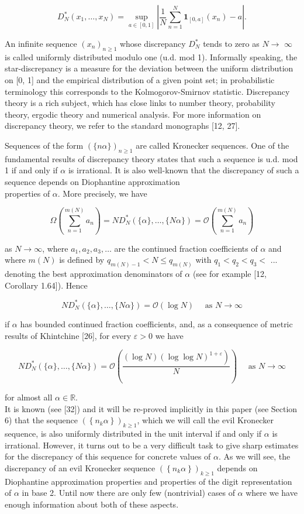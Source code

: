 \documentclass[10pt]{article}
\begin{document}
$$
D_{N}^{*}\left(x_{1}, \ldots, x_{N}\right)=\sup _{a \in[0,1]}\left|\frac{1}{N} \sum_{n=1}^{N} \mathbf{1}_{[0, a]}\left(x_{n}\right)-a\right| .
$$

An infinite sequence $\left(x_{n}\right)_{n \geqslant 1}$ whose discrepancy $D_{N}^{*}$ tends to zero as $N \rightarrow$ $\infty$ is called uniformly distributed modulo one (u.d. mod 1). Informally speaking, the star-discrepancy is a measure for the deviation between the uniform distribution on [0, 1] and the empirical distribution of a given point set; in probabilistic terminology this corresponds to the Kolmogorov-Smirnov statistic. Discrepancy theory is a rich subject, which has close links to number theory, probability theory, ergodic theory and numerical analysis. For more information on discrepancy theory, we refer to the standard monographs [12, 27].

Sequences of the form $(\{n \alpha\})_{n \geqslant 1}$ are called Kronecker sequences. One of the fundamental results of discrepancy theory states that such a sequence is u.d. mod 1 if and only if $\alpha$ is irrational. It is also well-known that the discrepancy of such a sequence depends on Diophantine approximation\\
properties of $\alpha$. More precisely, we have

$$
\Omega\left(\sum_{n=1}^{m(N)} a_{n}\right)=N D_{N}^{*}(\{\alpha\}, \ldots,\{N \alpha\})=\mathcal{O}\left(\sum_{n=1}^{m(N)} a_{n}\right)
$$

as $N \rightarrow \infty$, where $a_{1}, a_{2}, a_{3}, \ldots$ are the continued fraction coefficients of $\alpha$ and where $m(N)$ is defined by $q_{m(N)-1}<N \leqslant q_{m(N)}$ with $q_{1}<q_{2}<q_{3}<$ ... denoting the best approximation denominators of $\alpha$ (see for example [12, Corollary 1.64]). Hence

$$
N D_{N}^{*}(\{\alpha\}, \ldots,\{N \alpha\})=\mathcal{O}(\log N) \quad \text { as } N \rightarrow \infty
$$

if $\alpha$ has bounded continued fraction coefficients, and, as a consequence of metric results of Khintchine [26], for every $\varepsilon>0$ we have

$$
N D_{N}^{*}(\{\alpha\}, \ldots,\{N \alpha\})=\mathcal{O}\left(\frac{\left.(\log N)(\log \log N)^{1+\varepsilon}\right)}{N}\right) \quad \text { as } N \rightarrow \infty
$$

for almost all $\alpha \in \mathbb{R}$.\\[0pt]
It is known (see [32]) and it will be re-proved implicitly in this paper (see Section 6) that the sequence $\left(\left\{n_{k} \alpha\right\}\right)_{k \geqslant 1}$, which we will call the evil Kronecker sequence, is also uniformly distributed in the unit interval if and only if $\alpha$ is irrational. However, it turns out to be a very difficult task to give sharp estimates for the discrepancy of this sequence for concrete values of $\alpha$. As we will see, the discrepancy of an evil Kronecker sequence $\left(\left\{n_{k} \alpha\right\}\right)_{k \geqslant 1}$ depends on Diophantine approximation properties and properties of the digit representation of $\alpha$ in base 2. Until now there are only few (nontrivial) cases of $\alpha$ where we have enough information about both of these aspects.
\end{document}
